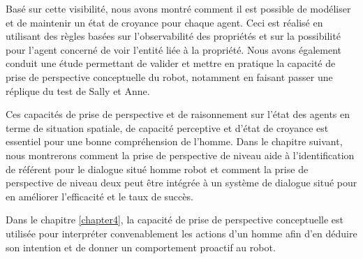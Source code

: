 \documentclass[a4paper,11pt,twoside]{StyleThese}
\begin{document}
Basé sur cette visibilité, nous avons montré comment il est possible de modéliser et de maintenir un état de croyance pour chaque agent. Ceci est réalisé en utilisant des règles basées sur l'observabilité des propriétés et sur la possibilité pour l'agent concerné de voir l'entité liée à la propriété.
Nous avons également conduit une étude permettant de valider et mettre en pratique la capacité de prise de perspective conceptuelle du robot, notamment en faisant passer une réplique du test de Sally et Anne.

Ces capacités de prise de perspective et de raisonnement sur l'état des agents en terme de situation spatiale, de capacité perceptive et d'état de croyance est essentiel pour une bonne compréhension de l'homme.
Dans le chapitre suivant, nous montrerons comment la prise de perspective de niveau aide à l'identification de référent pour le dialogue situé homme robot et comment la prise de perspective de niveau deux peut être intégrée à un système de dialogue situé pour en améliorer l'efficacité et le taux de succès.

Dans le chapitre \ref{chapter4}, la capacité de prise de perspective conceptuelle
est utilisée pour interpréter convenablement les actions d'un homme afin d'en déduire son intention et de donner un comportement proactif au robot.






\end{document}
